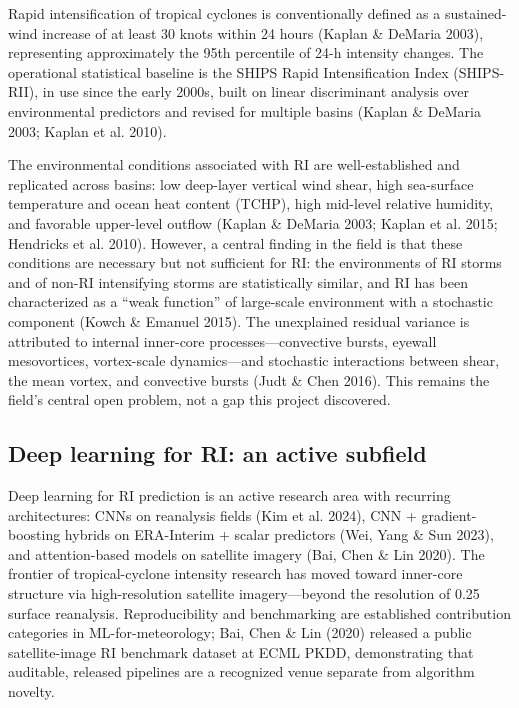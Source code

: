 \documentclass[11pt]{article}
\begin{document}
Rapid intensification of tropical cyclones is conventionally defined as a
sustained-wind increase of at least 30 knots within 24 hours (Kaplan \&
DeMaria 2003), representing approximately the 95th percentile of 24-h
intensity changes. The operational statistical baseline is the SHIPS Rapid
Intensification Index (SHIPS-RII), in use since the early 2000s, built on
linear discriminant analysis over environmental predictors and revised for
multiple basins (Kaplan \& DeMaria 2003; Kaplan et al. 2010).

The environmental conditions associated with RI are well-established and
replicated across basins: low deep-layer vertical wind shear, high
sea-surface temperature and ocean heat content (TCHP), high mid-level
relative humidity, and favorable upper-level outflow (Kaplan \& DeMaria
2003; Kaplan et al. 2015; Hendricks et al. 2010). However, a central finding
in the field is that these conditions are necessary but not sufficient for
RI: the environments of RI storms and of non-RI intensifying storms are
statistically similar, and RI has been characterized as a ``weak function''
of large-scale environment with a stochastic component (Kowch \& Emanuel
2015). The unexplained residual variance is attributed to internal
inner-core processes---convective bursts, eyewall mesovortices, vortex-scale
dynamics---and stochastic interactions between shear, the mean vortex, and
convective bursts (Judt \& Chen 2016). This remains the field's central open
problem, not a gap this project discovered.

\subsection{Deep learning for RI: an active subfield}

Deep learning for RI prediction is an active research area with recurring
architectures: CNNs on reanalysis fields (Kim et al. 2024), CNN +
gradient-boosting hybrids on ERA-Interim + scalar predictors (Wei, Yang \&
Sun 2023), and attention-based models on satellite imagery (Bai, Chen \& Lin
2020). The frontier of tropical-cyclone intensity research has moved toward
inner-core structure via high-resolution satellite imagery---beyond the
resolution of 0.25\textdegree{} surface reanalysis. Reproducibility and
benchmarking are established contribution categories in ML-for-meteorology;
Bai, Chen \& Lin (2020) released a public satellite-image RI benchmark
dataset at ECML PKDD, demonstrating that auditable, released pipelines are a
recognized venue separate from algorithm novelty.
\end{document}
